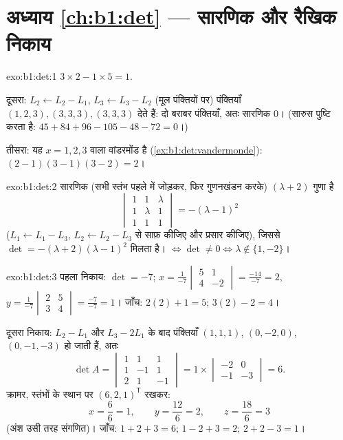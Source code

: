 \section*{अध्याय \ref{ch:b1:det} --- सारणिक और रैखिक निकाय}

\begin{solution}{exo:b1:det:1}
$3 \times 2 - 1 \times 5 = 1$.

दूसरा: $L_2 \leftarrow L_2 - L_1$, $L_3 \leftarrow L_3 - L_2$ (मूल पंक्तियों
पर) पंक्तियाँ $(1,2,3), (3,3,3), (3,3,3)$ देते हैं: दो बराबर पंक्तियाँ, अतः
सारणिक $0$। (सारुस पुष्टि करता है: $45 + 84 + 96 - 105 - 48 - 72 = 0$।)

तीसरा: यह $x = 1, 2, 3$ वाला वांडरमोंड है (\cref{ex:b1:det:vandermonde}):
$(2-1)(3-1)(3-2) = 2$।
\end{solution}

\begin{solution}{exo:b1:det:2}
सारणिक (सभी स्तंभ पहले में जोड़कर, फिर गुणनखंडन करके) $(\lambda + 2)$ गुणा
है
\[
\begin{vmatrix}
1 & 1 & \lambda\\ 1 & \lambda & 1\\ 1 & 1 & 1
\end{vmatrix}
= -(\lambda - 1)^2
\]
($L_1 \leftarrow L_1 - L_3$, $L_2 \leftarrow L_2 - L_3$ से साफ़ कीजिए और
प्रसार कीजिए), जिससे $\det = -(\lambda+2)(\lambda-1)^2$ मिलता है।  $\iff
\det \neq 0 \iff \lambda \notin \{1, -2\}$।
\end{solution}

\begin{solution}{exo:b1:det:3}
पहला निकाय: $\det = -7$; $x = \frac{1}{-7}\begin{vmatrix} 5 & 1\\ 4 &
-2\end{vmatrix} = \frac{-14}{-7} = 2$, $y = \frac{1}{-7}\begin{vmatrix} 2 &
5\\ 3 & 4\end{vmatrix} = \frac{-7}{-7} = 1$। जाँच: $2(2) + 1 = 5$; $3(2) - 2
= 4$।

दूसरा निकाय: $L_2 - L_1$ और $L_3 - 2L_1$ के बाद पंक्तियाँ $(1,1,1)$,
$(0,-2,0)$, $(0,-1,-3)$ हो जाती हैं, अतः
\[
\det A = \begin{vmatrix} 1&1&1\\ 1&-1&1\\ 2&1&-1\end{vmatrix}
= 1 \times \begin{vmatrix} -2 & 0\\ -1 & -3\end{vmatrix} = 6 .
\]
क्रामर, स्तंभों के स्थान पर $(6,2,1)^{\mathsf T}$ रखकर:
\[
x = \frac{6}{6} = 1, \qquad
y = \frac{12}{6} = 2, \qquad
z = \frac{18}{6} = 3
\]
(अंश उसी तरह संगणित)। जाँच: $1 + 2 + 3 = 6$; $1 - 2 + 3 = 2$; $2 + 2 - 3 =
1$।
\end{solution}


